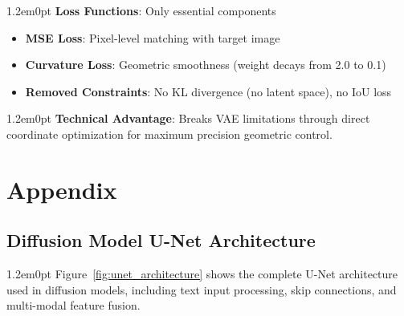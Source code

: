 \documentclass[10pt,a4paper]{article}
\newenvironment{bodytext}{\begin{adjustwidth}{1.2em}{0pt}}{\end{adjustwidth}}
\begin{document}
\begin{bodytext}
\textbf{Loss Functions}: Only essential components
\begin{itemize}
\item \textbf{MSE Loss}: Pixel-level matching with target image
\item \textbf{Curvature Loss}: Geometric smoothness (weight decays from 2.0 to 0.1)
\item \textbf{Removed Constraints}: No KL divergence (no latent space), no IoU loss
\end{itemize}
\end{bodytext}

\begin{bodytext}
\textbf{Technical Advantage}: Breaks VAE limitations through direct coordinate optimization for maximum precision geometric control.
\end{bodytext}

\section{Appendix}

\subsection{Diffusion Model U-Net Architecture}

\begin{bodytext}
Figure~\ref{fig:unet_architecture} shows the complete U-Net architecture used in diffusion models, including text input processing, skip connections, and multi-modal feature fusion.
\end{bodytext}
\end{document}
